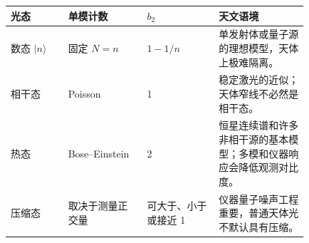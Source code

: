 \begin{longtable}{p{0.16\linewidth}p{0.22\linewidth}p{0.20\linewidth}p{0.25\linewidth}}
\toprule
光态 & 单模计数 & \(b_2\) & 天文语境 \\
\midrule
数态 \(|n\rangle\) & 固定 \(N=n\) & \(1-1/n\) & 单发射体或量子源的理想模型，天体上极难隔离。 \\
相干态 & Poisson & 1 & 稳定激光的近似；天体窄线不必然是相干态。 \\
热态 & Bose--Einstein & 2 & 恒星连续谱和许多非相干源的基本模型；多模和仪器响应会降低观测对比度。 \\
压缩态 & 取决于测量正交量 & 可大于、小于或接近 1 & 仪器量子噪声工程重要，普通天体光不默认具有压缩。 \\
\bottomrule
\end{longtable}
